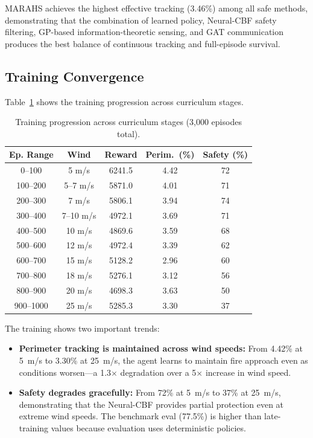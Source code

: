 \documentclass[12pt,a4paper]{article}
\begin{document}
MARAHS achieves the highest effective tracking (3.46\%) among all safe methods, demonstrating that the combination of learned policy, Neural-CBF safety filtering, GP-based information-theoretic sensing, and GAT communication produces the best balance of continuous tracking and full-episode survival.

\subsection{Training Convergence}

Table~\ref{tab:training_stages} shows the training progression across curriculum stages.

\begin{table}[t]
\centering
\caption{Training progression across curriculum stages (3,000 episodes total).}
\label{tab:training_stages}
\begin{tabular}{ccccc}
\toprule
\textbf{Ep. Range} & \textbf{Wind} & \textbf{Reward} & \textbf{Perim.\ (\%)} & \textbf{Safety (\%)} \\
\midrule0--100    & 5 m/s  & 6241.5 & 4.42 & 72 \\
100--200  & 5--7 m/s & 5871.0 & 4.01 & 71 \\
200--300  & 7 m/s  & 5806.1 & 3.94 & 74 \\
300--400  & 7--10 m/s & 4972.1 & 3.69 & 71 \\
400--500  & 10 m/s & 4869.6 & 3.59 & 68 \\
500--600  & 12 m/s & 4972.4 & 3.39 & 62 \\
600--700  & 15 m/s & 5128.2 & 2.96 & 60 \\
700--800  & 18 m/s & 5276.1 & 3.12 & 56 \\
800--900  & 20 m/s & 4698.3 & 3.63 & 50 \\
900--1000 & 25 m/s & 5285.3 & 3.30 & 37 \\\bottomrule
\end{tabular}
\end{table}

The training shows two important trends:
\begin{itemize}[leftmargin=*]
    \item \textbf{Perimeter tracking is maintained across wind speeds:} From 4.42\% at 5~m/s to 3.30\% at 25~m/s, the agent learns to maintain fire approach even as conditions worsen---a 1.3$\times$ degradation over a 5$\times$ increase in wind speed.
    \item \textbf{Safety degrades gracefully:} From 72\% at 5~m/s to 37\% at 25~m/s, demonstrating that the Neural-CBF provides partial protection even at extreme wind speeds. The benchmark eval (77.5\%) is higher than late-training values because evaluation uses deterministic policies.
\end{itemize}
\end{document}
